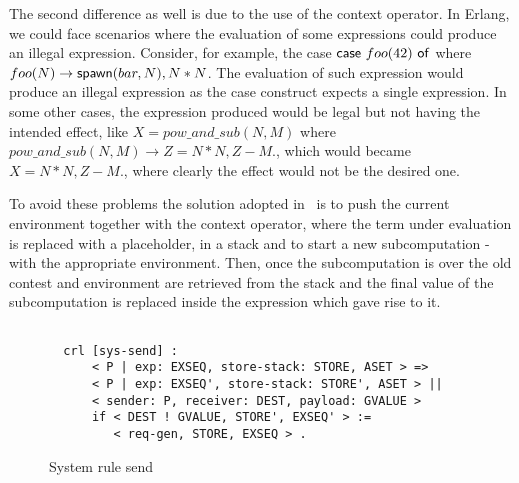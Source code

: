 \documentclass{article}[12pt,a4paper]
\theoremstyle{definition}
\begin{document}
The second difference as well is due to the use of the context operator. In
Erlang, we
could face scenarios where the evaluation of some expressions could
produce an illegal expression. Consider, for example, the case
$\mathsf{case}~foo(42)~\mathsf{of}$ where $foo(N) \rightarrow \mathsf{spawn}(bar,N), N*N$.
The evaluation of such expression would produce an illegal expression as the case construct expects a single expression. In
some other cases, the expression produced would be legal but not having the
intended effect, like $X=pow\_and\_sub(N,M)$ where $pow\_and\_sub(N,M)
\rightarrow Z = N*N, Z-M.$, which would became $X=N*N, Z-M.$, where clearly the
effect would not be the desired one.

To avoid these problems the solution adopted
in~\cite{Gonzalez-AbrilV21} is to push the current environment together with the
context operator, where the term under evaluation is replaced with a
placeholder, in a stack and to start a new subcomputation - with the appropriate
environment. Then, once the
subcomputation is over the old contest and environment are retrieved from the
stack and the final value of the subcomputation is replaced inside the expression
which gave rise to it.

\begin{figure}[t]
  \centering
\begin{verbatim}

  crl [sys-send] :
      < P | exp: EXSEQ, store-stack: STORE, ASET > =>
      < P | exp: EXSEQ', store-stack: STORE', ASET > ||
      < sender: P, receiver: DEST, payload: GVALUE >
      if < DEST ! GVALUE, STORE', EXSEQ' > :=
         < req-gen, STORE, EXSEQ > .
\end{verbatim}
  \caption{System rule send}
  \label{fig:rule-send}
\end{figure}
\end{document}
